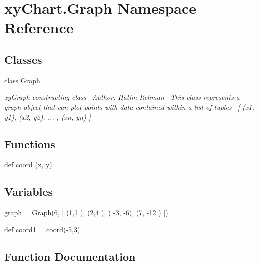 \hypertarget{namespacexy_chart_1_1_graph}{}\section{xy\+Chart.\+Graph Namespace Reference}
\label{namespacexy_chart_1_1_graph}
\subsection*{Classes}
\begin{DoxyCompactItemize}
\item 
class \hyperlink{classxy_chart_1_1_graph_1_1_graph}{Graph}
\begin{DoxyCompactList}\small\item\em xy\+Graph constructing class~\newline
 Author\+: Hatim Rehman~\newline
 This class represents a graph object that can plot points with data contained within a list of tuples~\newline
\mbox{[} (x1, y1), (x2, y2), ... , (xn, yn) \mbox{]} \end{DoxyCompactList}\end{DoxyCompactItemize}
\subsection*{Functions}
\begin{DoxyCompactItemize}
\item 
def \hyperlink{namespacexy_chart_1_1_graph_a3e2c4e3989f17aadcd35098ef933eab5}{coord} (x, y)
\end{DoxyCompactItemize}
\subsection*{Variables}
\begin{DoxyCompactItemize}
\item 
\hyperlink{namespacexy_chart_1_1_graph_a98b3e64a8154411b646bfd625526d45c}{graph} = \hyperlink{classxy_chart_1_1_graph_1_1_graph}{Graph}(6, \mbox{[} (1,1 ), (2,4 ), ( -\/3, -\/6), (7, -\/12 ) \mbox{]})
\item 
def \hyperlink{namespacexy_chart_1_1_graph_a9918deaf97fee10618afa250ca5d73eb}{coord1} = \hyperlink{namespacexy_chart_1_1_graph_a3e2c4e3989f17aadcd35098ef933eab5}{coord}(-\/5,3)
\end{DoxyCompactItemize}


\subsection{Function Documentation}
\hypertarget{namespacexy_chart_1_1_graph_a3e2c4e3989f17aadcd35098ef933eab5}{}\label{namespacexy_chart_1_1_graph_a3e2c4e3989f17aadcd35098ef933eab5} 
